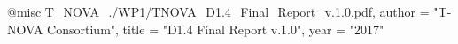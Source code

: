 @misc{ T_NOVA_./WP1/TNOVA_D1.4_Final_Report_v.1.0.pdf,
       author = "T-NOVA Consortium",
       title = "D1.4 Final Report v.1.0",
       year = "2017" }
